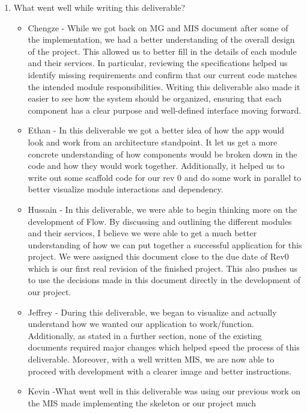 \documentclass[12pt, titlepage]{article}
\begin{document}
\begin{enumerate}
  \item What went well while writing this deliverable?
  \begin{itemize}
    \item Chengze - While we got back on MG and MIS document after some of the implementation,
    we had a better understanding of the overall design of the project. This allowed us to
    better fill in the details of each module and their services. In particular, reviewing the
    specifications helped us identify missing requirements and confirm that our current code
    matches the intended module responsibilities. Writing this deliverable also made it easier
    to see how the system should be organized, ensuring that each component has a clear purpose
    and well-defined interface moving forward.
    \item Ethan - In this deliverable we got a better idea of how the app would
      look and work from an architecture standpoint. It let us get a more
      concrete understanding of how components would be broken down in the code
      and how they would work together. Additionally, it helped us to write out
      some scaffold code for our rev 0 and do some work in parallel to better
      visualize module interactions and dependency.
    \item Hussain - In this deliverable, we were able to begin thinking more on
    the development of Flow. By discussing and outlining the different modules
    and their services, I believe we were able to get a much better
    understanding of how we can put together a successful application for this
    project. We were assigned this document close to the due date of Rev0 which
    is our first real revision of the finished project. This also pushes us to
    use the decisions made in this document directly in the development of our
    project.
    \item Jeffrey - During this deliverable, we began to visualize and
    actually understand how we wanted our application to work/function.
    Additionally, as stated in a further section, none of the existing
    documents required major changes which helped speed the process of
    this deliverable. Moreover, with a well written MIS, we are now able
    to proceed with development with a clearer image and better instructions.
    \item Kevin -What went well in this deliverable was using our previous 
     work on the MIS made implementing the skeleton or our project much

\end{itemize}
\end{enumerate}
\end{document}
